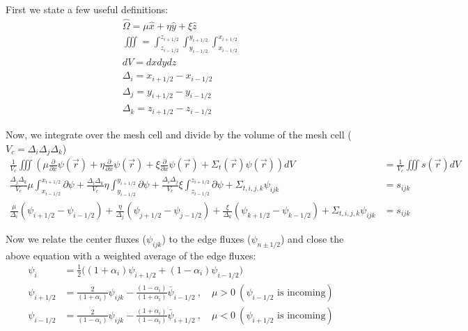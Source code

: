 \documentclass[10pt]{article}
\begin{document}
First we state a few useful definitions:
%
\begin{gather*}
     \hat{\Omega} = \mu\hat{x} + \eta\hat{y} + \xi\hat{z} \\
     \iiint = \int_{z_{i - 1/2}}^{z_{i + 1/2}} \int_{y_{i - 1/2}}^{y_{i + 1/2}} \int_{x_{i - 1/2}}^{x_{i + 1/2}} \\
     dV = dxdydz \\
     \Delta_i = x_{i + 1/2 } - x_{i - 1/2} \\
     \Delta_j = y_{i + 1/2 } - y_{i - 1/2} \\
     \Delta_k = z_{i + 1/2 } - z_{i - 1/2}
\end{gather*}

Now, we integrate over the mesh cell and divide by the volume of the mesh cell ($V_c = \Delta_i\Delta_j\Delta_k$)
%
\begin{align*}
    \frac{1}{V_c}\iiint \left( \mu \frac{\partial}{\partial x} \psi(\vec{r}) + \eta \frac{\partial}{\partial x} \psi(\vec{r})  +\xi \frac{\partial}{\partial x} \psi(\vec{r})  + \Sigma_t(\vec{r}) \psi(\vec{r}) \right) dV &= \frac{1}{V_c}\iiint s(\vec{r}) dV \\
    \frac{\Delta_j\Delta_k}{V_c} \mu \int_{x_{i - 1/2}}^{x_{i + 1/2}} \partial \psi  + \frac{\Delta_i\Delta_k}{V_c} \eta \int_{y_{i - 1/2}}^{y_{i + 1/2}} \partial \psi + \frac{\Delta_i\Delta_j}{V_c} \xi \int_{z_{i - 1/2}}^{z_{i + 1/2}} \partial \psi + \Sigma_{t,i,j,k}\psi_{ijk} &= s_{ijk}  \\
    \frac{\mu}{\Delta_i} (\psi_{i+1/2} - \psi_{i-1/2} ) + \frac{\eta}{\Delta_j} (\psi_{j+1/2} - \psi_{j-1/2} ) + \frac{\xi}{\Delta_k} (\psi_{k+1/2} - \psi_{k-1/2} ) + \Sigma_{t,i,j,k}\psi_{ijk} &= s_{ijk}
\end{align*}

Now we relate the center fluxes ($\psi_{ijk}$) to the edge fluxes ($\psi_{n\pm 1/2}$) and close the above equation with a weighted average of the edge fluxes:
%
\begin{align*}
\psi_{i} &= \frac{1}{2}\bigl((1+\alpha_i)\psi_{i+1/2}+(1-\alpha_i)\psi_{i-1/2}\bigr)\\
\psi_{i+1/2} &= \frac{2}{(1+\alpha_i)}\psi_{ijk}-
    \frac{(1-\alpha_i)}{(1+\alpha_i)}\bar{\psi}_{i-1/2}\:,\quad \mu>0\:(\psi_{i-1/2}\text{ is incoming})\\
\psi_{i-1/2} &= \frac{2}{(1-\alpha_i)}\psi_{ijk}-
    \frac{(1+\alpha_i)}{(1-\alpha_i)}\bar{\psi}_{i+1/2}\:,\quad \mu<0 \:(\psi_{i+1/2}\text{ is incoming})
\end{align*}
\end{document}
